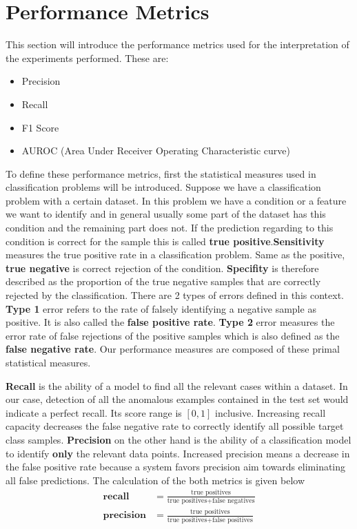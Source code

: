 \section{Performance Metrics}
\label{sec:perf_metric}
This section will introduce the performance metrics used for the interpretation of the experiments performed.
These are:
\begin{itemize}
	\item Precision
	\item Recall
	\item F1 Score
	\item AUROC (Area Under Receiver Operating Characteristic curve)
\end{itemize}

To define these performance metrics, first the statistical measures used in  classification problems  
will be introduced. Suppose we have a classification problem with a certain dataset. In this problem we 
have a condition or a feature we want to identify and in general usually some part of the dataset has 
this condition and the remaining part does not. If the prediction regarding to this condition is correct 
for the sample this is called \textbf{true positive}.\textbf{Sensitivity} measures the true positive rate in a 
classification problem. Same as the positive, \textbf{true negative} is correct rejection of the condition. 
\textbf{Specifity} is therefore described as the proportion of the true negative samples that are correctly 
rejected by the classification. There are 2 types of errors defined in this context. \textbf{Type 1} 
error refers to the rate of falsely identifying a negative sample as positive. It is also called the 
\textbf{false positive rate}. \textbf{Type 2} error measures the error rate of false rejections of the 
positive samples which is also defined as the \textbf{false negative rate}. Our performance measures are 
composed of these primal statistical measures. 

\textbf{Recall} is the ability of a model to find all the relevant cases within a dataset. In our case, 
detection of all the anomalous examples contained in the test set would indicate a perfect recall. Its 
score range is $[0,1]$ inclusive. Increasing recall capacity decreases the false negative rate to 
correctly identify all possible target class samples. \textbf{Precision} on the other hand is the 
ability of a classification model to identify \textbf{only} the relevant data points. Increased precision 
means a decrease in the false positive rate because a system favors precision aim towards eliminating all 
false predictions. The calculation of the both metrics is given below
\begin{align}
\textbf{recall} & = \frac{\text{true positives}}{\text{true positives} + \text{false negatives}} \\[5pt]
\textbf{precision} & = \frac{\text{true positives}}{\text{true positives} + \text{false positives}}
\end{align}

